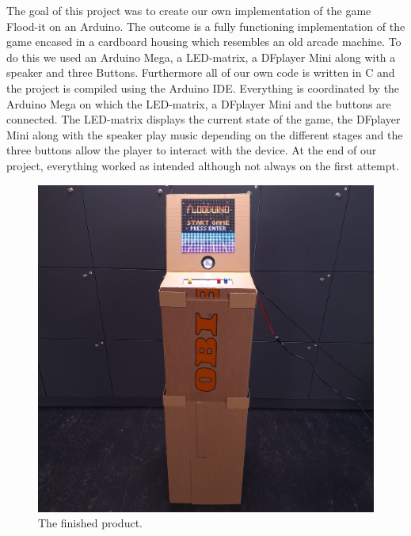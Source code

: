 \documentclass[10pt, a4paper]{article}
\begin{document}
The goal of this project was to create our own implementation of the game Flood-it on an Arduino.  The outcome is a fully functioning implementation of the game encased in a cardboard housing which resembles an old arcade machine. To do this we used an Arduino Mega, a LED-matrix, a DFplayer Mini along with a speaker and three Buttons. Furthermore all of our own code is written in C and the project is compiled using the Arduino IDE. Everything is coordinated by the Arduino Mega on which the LED-matrix, a DFplayer Mini and the buttons are connected. The LED-matrix displays the current state of the game, the DFplayer Mini along with the speaker play music depending on the different stages and the three buttons allow the player to interact with the device. At the end of our project, everything worked as intended although not always on the first attempt.
\begin{figure}[h]
    \centering
    \begin{minipage}{0.48\linewidth}
    \centering
    \includegraphics[width=\linewidth]{Finished_Product.png}
    \caption{The finished product.}
    \end{minipage}
    \hfill
    \begin{minipage}{0.48\linewidth}

\end{minipage}
\end{figure}
\end{document}
